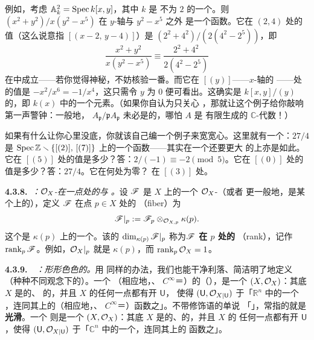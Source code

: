 例如，考虑\trScheme{} $\mathbb{A}^2_k=\operatorname{Spec} k[x,y]$，其中 $k$ 是\trCharacteristic{}
不为 $2$ 的一个\trField。则 $(x^2+y^2)/x(y^2-x^5)$ 在 $y$-轴与\trCurve{}
$y^2-x^5$ 之外
是一个函数。它在 $(2,4)$ 处的值（这么说意指 $[(x-2,\,y-4)]$）是
$(2^2+4^2)/(2(4^2-2^5))$，即
\[
\frac{x^2+y^2}{x(y^2-x^5)}\equiv\frac{2^2+4^2}{2(4^2-2^5)}
\]
在\trResidueField{}中成立——若你觉得神秘，不妨核验一番。而它在 $[(y)]$——$x$-轴的%
\trGenericPoint——处的值是 $-x^2/x^6=-1/x^4$，这只需令 $y$ 为 $0$ 便可看出。这确实是
$k[x,y]/(y)$ 的\trFractionField，即 $k(x)$ 中的一个元素。（如果你自认为只关心%
\trAlgClosedField，那就让这个例子给你敲响第一声警钟：一般地，
$A_{\mathfrak{p}}/\mathfrak{p}A_{\mathfrak{p}}$ 未必是\trAlgClosed{}的，哪怕 $A$ 是
有限生成的 $\mathbb{C}$-代数！）

如果有什么让你心里没底，你就该自己编一个例子来宽宽心。这里就有一个：$27/4$ 是
$\operatorname{Spec}\mathbb{Z}\smallsetminus\{[(2)],\,[(7)]\}$ 上的一个函数——其实在一个还要更大
的\trOpenSubset{}上亦是如此。它在 $[(5)]$ 处的值是多少？答：$2/(-1)\equiv-2
\pmod{5}$。它在\trGenericPoint{} $[(0)]$ 处的值是多少？答：$27/4$。它在何处为零？
在 $[(3)]$ 处。

\textbf{4.3.8.}\ \emph{\trhDefinition{}：$\mathcal{O}_X$-\trModule{}在一点处的\trFiber{}与%
\trRank{}。}\quad 设 $\mathscr{F}$ 是\trScheme{} $X$ 上的一个 $\mathcal{O}_X$-\trModule（或者
更一般地，是某个\trLocallyRingedSpace{}上的），定义 $\mathscr{F}$ 在点 $p\in X$ 处的%
\textbf{\trFiber}（fiber）为
\[
\mathscr{F}|_p:=\mathscr{F}_p\otimes_{\mathcal{O}_{X,p}}\kappa(p).
\]
这个\trFiber{}是 $\kappa(p)$ 上的一个\trVectorSpace。该\trVectorSpace{}的%
\trDimension{} $\dim_{\kappa(p)}\mathscr{F}|_p$ 称为\textbf{$\mathscr{F}$ 在 $p$ 处的%
\trRank}（rank），记作 $\mathrm{rank}_p\,\mathscr{F}$。例如，$\mathcal{O}_X|_p$ 就是
$\kappa(p)$，而
$\mathrm{rank}_p\,\mathcal{O}_X=1$。

\textbf{4.3.9.}\ \hard\ \emph{\trhDefinition{}：形形色色的\trManifold{}。}\quad 用
同样的办法，我们也能干净利落、简洁明了地定义（种种不同观念下的）\trManifold。一个%
\textbf{\trTopology}（相应地，\textbf{\trDifferentiable}、
$C^\infty$＝\textbf{\trSmooth}）的（\trReal）\textbf{\trManifold}，是一个%
\trRingedSpace{} $(X,\mathcal{O}_X)$：其底\trTopologicalSpace{} $X$ 是\trHausdorff{}的、%
\trSecondCountable{}的，并且 $X$ 的任何一点都有开\trNeighborhood{} $\mathsf{U}$，
使得 $(\mathsf{U},\mathcal{O}_{X|\mathsf{U}})$ \trIsomorphic{}于「$\mathbb{R}^n$ 中的一个%
\trOpenBall，连同其上的\trContinuous（相应地，\trDifferentiable、
$C^\infty$＝\trSmooth）\trRealValued{}函数之\trSheaf」。不带修饰语的单说
「\trManifold」，常指的就是\textbf{光滑\trManifold}。一个%
\textbf{\trComplex\trManifold}则是一个\trRingedSpace{} $(X,\mathcal{O}_X)$：其底%
\trTopologicalSpace{} $X$ 是\trHausdorff{}的、\trSecondCountable{}的，并且 $X$ 的
任何一点都有开\trNeighborhood{} $\mathsf{U}$，使得 $(\mathsf{U},\mathcal{O}_{X|\mathsf{U}})$
\trIsomorphic{}于「$\mathbb{C}^n$ 中的一个\trOpenBall，连同其上的%
\trHolomorphic{}函数之\trSheaf」。
